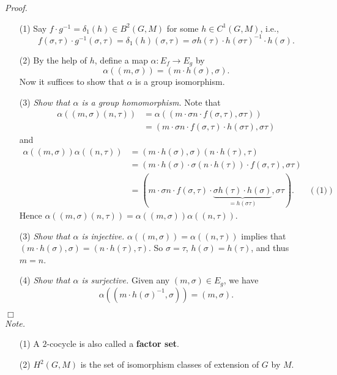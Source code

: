 \documentclass{article}
\begin{document}
\emph{Proof.}
\begin{enumerate}
\item[(1)]
  Say $f \cdot g^{-1} = \delta_1(h) \in B^{2}(G,M)$ for some $h \in C^{1}(G,M)$, i.e.,
  \[
    f(\sigma,\tau) \cdot g^{-1}(\sigma,\tau)
    = \delta_1(h)(\sigma,\tau)
    = \sigma h(\tau) \cdot h(\sigma\tau)^{-1} \cdot h(\sigma).
  \]

\item[(2)]
  By the help of $h$, define a map $\alpha: E_f \to E_g$ by
  \[
    \alpha((m,\sigma)) = (m \cdot h(\sigma), \sigma).
  \]
  Now it suffices to show that $\alpha$ is a group isomorphism.

\item[(3)]
  \emph{Show that $\alpha$ is a group homomorphism.}
  Note that
  \begin{align*}
    \alpha((m,\sigma)(n,\tau))
    &= \alpha((m \cdot \sigma n \cdot f(\sigma,\tau), \sigma\tau)) \\
    &= (m \cdot \sigma n \cdot f(\sigma,\tau) \cdot h(\sigma\tau), \sigma\tau)
  \end{align*}
  and
  \begin{align*}
    \alpha((m,\sigma))\alpha((n,\tau))
    &= (m \cdot h(\sigma), \sigma)(n \cdot h(\tau), \tau) \\
    &= (m \cdot h(\sigma) \cdot \sigma(n \cdot h(\tau)) \cdot f(\sigma,\tau), \sigma\tau) \\
    &= (m \cdot \sigma n \cdot f(\sigma,\tau) \cdot
        \underbrace{\sigma h(\tau) \cdot h(\sigma)}_{= h(\sigma\tau)}, \sigma\tau).
      &(\text{(1)})
  \end{align*}
  Hence $\alpha((m,\sigma)(n,\tau)) = \alpha((m,\sigma))\alpha((n,\tau))$.

\item[(3)]
  \emph{Show that $\alpha$ is injective.}
  $\alpha((m,\sigma)) = \alpha((n,\tau))$ implies that
  $(m \cdot h(\sigma), \sigma) = (n \cdot h(\tau),\tau)$.
  So $\sigma = \tau$, $h(\sigma) = h(\tau)$, and thus $m = n$.
  
\item[(4)]
  \emph{Show that $\alpha$ is surjective.}
  Given any $(m,\sigma) \in E_g$, we have
  \[
    \alpha((m \cdot h(\sigma)^{-1}, \sigma)) = (m, \sigma).
  \]
\end{enumerate}
$\Box$ \\



\emph{Note.}
\begin{enumerate}
\item[(1)]
  A $2$-cocycle is also called a \textbf{factor set}.

\item[(2)]
  $H^2(G,M)$ is the set of isomorphism classes of extension of $G$ by $M$. \\\\
\end{enumerate}
\end{document}
